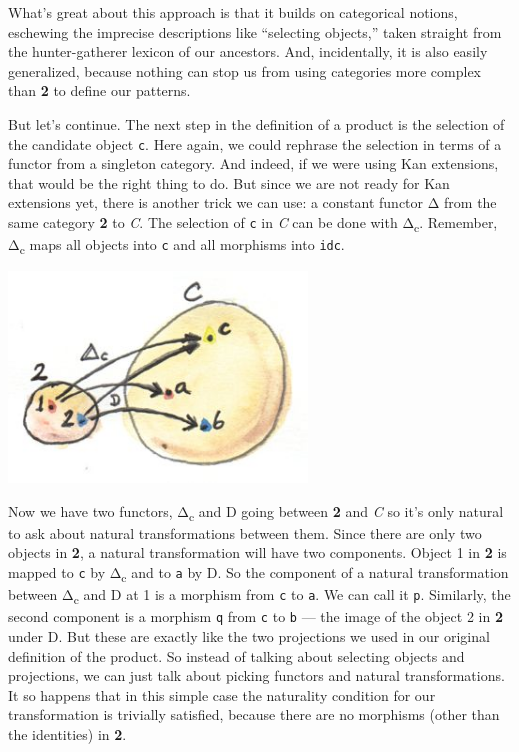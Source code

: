 What's great about this approach is that it builds on categorical
notions, eschewing the imprecise descriptions like ``selecting
objects,'' taken straight from the hunter-gatherer lexicon of our
ancestors. And, incidentally, it is also easily generalized, because
nothing can stop us from using categories more complex than \textbf{2}
to define our patterns.

But let's continue. The next step in the definition of a product is the
selection of the candidate object \texttt{c}. Here again, we could
rephrase the selection in terms of a functor from a singleton category.
And indeed, if we were using Kan extensions, that would be the right
thing to do. But since we are not ready for Kan extensions yet, there is
another trick we can use: a constant functor Δ from the same category
\textbf{2} to \emph{C}. The selection of \texttt{c} in \emph{C} can be
done with Δ\textsubscript{c}. Remember, Δ\textsubscript{c} maps all
objects into \texttt{c} and all morphisms into \texttt{idc}.

\includegraphics[width=3.12500in]{images/twodelta.jpg}

Now we have two functors, Δ\textsubscript{c} and D going between
\textbf{2} and \emph{C} so it's only natural to ask about natural
transformations between them. Since there are only two objects in
\textbf{2}, a natural transformation will have two components. Object 1
in \textbf{2} is mapped to \texttt{c} by Δ\textsubscript{c} and to
\texttt{a} by D. So the component of a natural transformation between
Δ\textsubscript{c} and D at 1 is a morphism from \texttt{c} to
\texttt{a}. We can call it \texttt{p}. Similarly, the second component
is a morphism \texttt{q} from \texttt{c} to \texttt{b} --- the image of
the object 2 in \textbf{2} under D. But these are exactly like the two
projections we used in our original definition of the product. So
instead of talking about selecting objects and projections, we can just
talk about picking functors and natural transformations. It so happens
that in this simple case the naturality condition for our transformation
is trivially satisfied, because there are no morphisms (other than the
identities) in \textbf{2}.

